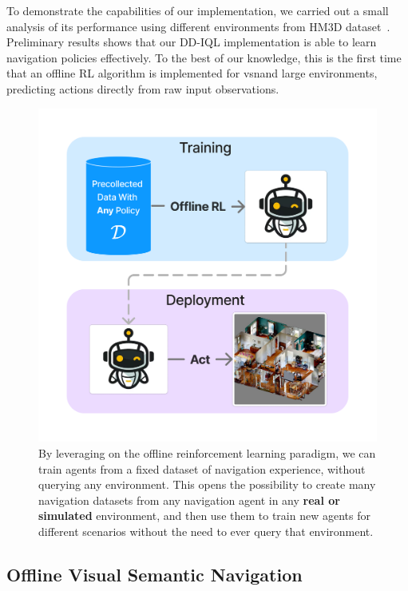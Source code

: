 To demonstrate the capabilities of our implementation, we carried out a small analysis of its performance using different environments from HM3D dataset~\cite{Ramakrishnan2021HabitatMatterport3D}.
Preliminary results shows that our DD-IQL implementation is able to learn navigation policies effectively.
To the best of our knowledge, this is the first time that an offline RL algorithm is implemented for \acrshort{vsn}\@ and large environments, predicting actions directly from raw input observations.

\begin{figure}
    \centering
    \includegraphics[width=\linewidth]{figures/offnav/graphical_abstract}
    \caption{
        By leveraging on the offline reinforcement learning paradigm, we can train agents from a fixed dataset of navigation experience, without querying any environment.
        This opens the possibility to create many navigation datasets from any navigation agent in any \textbf{real or simulated} environment, and then use them to train new agents for different scenarios without the need to ever query that environment.
    }
    \label{fig:abstract_offnav}
\end{figure}

\subsection{Offline Visual Semantic Navigation}\label{subsec:offline-navigation}

